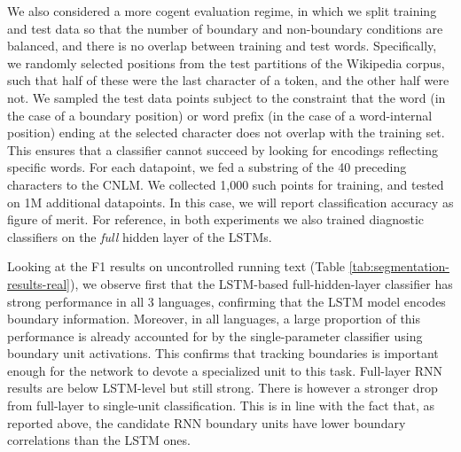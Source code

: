 We also considered a more cogent evaluation regime, in which we split
training and test data so that the number of boundary and non-boundary
conditions are balanced, and there is no overlap between training and
test words. Specifically, we randomly selected positions from the test
partitions of the Wikipedia corpus, such that half of these were the
last character of a token, and the other half were not.  %
We sampled the test data points subject to the constraint that the
word (in the case of a boundary position) or word prefix (in the case
of a word-internal position) ending at the selected character does not
overlap with the training set. This ensures that a classifier cannot
succeed by looking for encodings reflecting specific words.  For each
datapoint, we fed a substring of the 40 preceding characters to the
CNLM. %
We collected 1,000 such points for training, and tested on 1M additional datapoints. In this
case, we will report classification accuracy as figure of merit.
For reference, in both experiments we also trained diagnostic
classifiers on the \emph{full} hidden layer of the LSTMs.

Looking at the F1 results on uncontrolled running text (Table
\ref{tab:segmentation-results-real}), we observe first that the
LSTM-based full-hidden-layer classifier has strong performance in all
3 languages, confirming that the LSTM model encodes boundary
information.  Moreover, in all languages, a large proportion of this
performance is already accounted for by the single-parameter
classifier using boundary unit activations. This confirms that
tracking boundaries is important enough for the network to devote a
specialized unit to this task. Full-layer RNN results are below
LSTM-level but still strong. There is however a
stronger drop from full-layer to single-unit classification. This is in
line with the fact that, as reported above, the candidate RNN boundary units have lower
boundary correlations than the LSTM ones.

